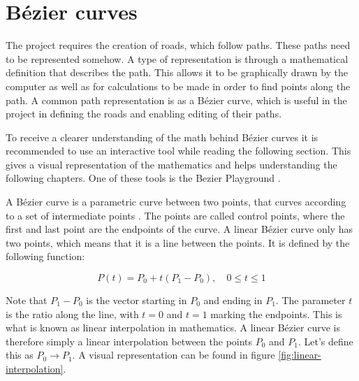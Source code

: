 \newcommand{\timeconstraint}{, \quad 0 \le t \le 1}
\newcommand{\lerp}{\rightarrow}
\newcommand{\p}[1]{P\textsubscript{#1}}

\section{Bézier curves}
    The project requires the creation of roads, which follow paths. These paths need to be represented somehow. A type of representation is through a mathematical definition that describes the path. This allows it to be graphically drawn by the computer as well as for calculations to be made in order to find points along the path. A common path representation is as a Bézier curve, which is useful in the project in defining the roads and enabling editing of their paths.

    To receive a clearer understanding of the math behind Bézier curves it is recommended to use an interactive tool while reading the following section. This gives a visual representation of the mathematics and helps understanding the following chapters. One of these tools is the Bezier Playground \cite{bezier-playground}.

    A Bézier curve is a parametric curve between two points, that curves according to a set of intermediate points \cite{bezier-curves}. The points are called control points, where the first and last point are the endpoints of the curve. A linear Bézier curve only has two points, which means that it is a line between the points. It is defined by the following function:

    $$
        P(t) = P_0 + t(P_1 - P_0) \timeconstraint
    $$

    Note that $P_1 - P_0$ is the vector starting in $P_0$ and ending in $P_1$. The parameter $t$ is the ratio along the line, with $t = 0$ and $t = 1$ marking the endpoints. This is what is known as linear interpolation in mathematics. A linear Bézier curve is therefore simply a linear interpolation between the points $P_0$ and $P_1$. Let's define this as $P_0 \lerp P_1$. A visual representation can be found in figure \ref{fig:linear-interpolation}.


